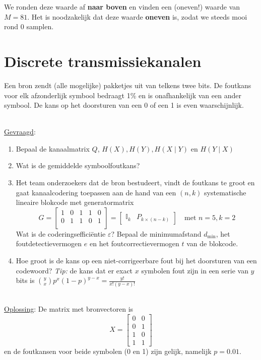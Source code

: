 \documentclass[kulak]{kulakarticle}
\begin{document}
	We ronden deze waarde af \textbf{naar boven} en vinden een (oneven!) waarde van \(M=\boxed{81}\). Het is noodzakelijk dat deze waarde \textbf{oneven} is, zodat we steeds mooi rond 0 samplen.


	\newpage \section{Discrete transmissiekanalen}

	Een bron zendt (alle mogelijke) pakketjes uit van telkens twee bits. De foutkans voor elk afzonderlijk symbool bedraagt 1\% en is onafhankelijk van een ander symbool. De kans op het doorsturen van een 0 of een 1 is even waarschijnlijk.

	\hfill \\
	\underline{Gevraagd}:
	\begin{enumerate}
		\item Bepaal de kanaalmatrix \(Q\), \(H(X), H(Y), H(X\mid Y)\) en \(H(Y\mid X)\)
		\item Wat is de gemiddelde symboolfoutkans?
		\item Het team onderzoekers dat de bron bestudeert, vindt de foutkans te groot en gaat kanaalcodering toepassen aan de hand van een \((n,k)\) systematische lineaire blokcode met generatormatrix \[
		G=\begin{bmatrix}
		1 & 0 & 1 & 1 & 0 \\
		0 & 1 & 1 & 0 & 1 \\
		\end{bmatrix}=\begin{bmatrix}
		\mathbb{I}_{k} & P_{k\times (n-k)}
	\end{bmatrix} \quad \text{met } n=5, k=2\]Wat is de coderingsefficiëntie \(\varepsilon\)? Bepaal de minimumafstand \(d_{\text{min}}\), het foutdetectievermogen \(e\) en het foutcorrectievermogen \(t\) van de blokcode.
		\item Hoe groot is de kans op een niet-corrigeerbare fout bij het doorsturen van een codewoord? \textit{Tip:} de kans dat er exact \(x\) symbolen fout zijn in een serie van \(y\) bits is \(\binom{y}{x}p^x(1-p)^{y-x}=\frac{y!}{x!(y-x)!}\)
	\end{enumerate}

	\hfill \\
	\underline{Oplossing}:
	De matrix met bronvectoren is \[
	X=\begin{bmatrix}
		0 & 0 \\
		0 & 1 \\
		1 & 0 \\
		1 & 1
	\end{bmatrix}\]
	en de foutkansen voor beide symbolen (0 en 1) zijn gelijk, namelijk \(p=0.01\).
\end{document}

